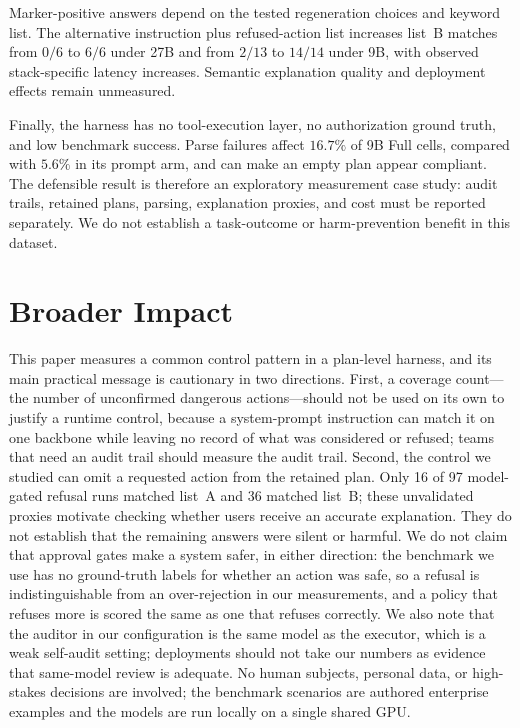 \documentclass[11pt]{article}
\begin{document}
Marker-positive answers depend on the tested regeneration choices and keyword list.
The alternative instruction plus refused-action list increases list~B matches from
$0/6$ to $6/6$ under 27B and from $2/13$ to $14/14$ under 9B, with observed
stack-specific latency increases. Semantic explanation quality and deployment effects
remain unmeasured.

Finally, the harness has no tool-execution layer, no authorization ground truth, and
low benchmark success. Parse failures affect $16.7\%$ of 9B Full cells, compared with
$5.6\%$ in its prompt arm, and can make an empty plan appear compliant. The defensible
result is therefore an exploratory measurement case study: audit trails, retained
plans, parsing, explanation proxies, and cost must be reported separately. We do not
establish a task-outcome or harm-prevention benefit in this dataset.

\section*{Broader Impact}

This paper measures a common control pattern in a plan-level harness, and
its main practical message is cautionary in two directions. First, a coverage
count---the number of unconfirmed dangerous actions---should not be used on its
own to justify a runtime control, because a system-prompt instruction can
match it on one backbone while leaving no record of what was considered or refused; teams that
need an audit trail should measure the audit trail. Second, the control we
studied can omit a requested action from the retained plan. Only 16 of 97 model-gated refusal runs matched list~A and 36 matched list~B; these unvalidated proxies motivate checking whether users receive an accurate explanation. They do not establish that the remaining answers were silent or harmful. We do not claim that approval gates make a
system safer, in either direction: the benchmark we use has no ground-truth
labels for whether an action was safe, so a refusal is indistinguishable from an
over-rejection in our measurements, and a policy that refuses more is scored the
same as one that refuses correctly. We also note that the auditor in our
configuration is the same model as the executor, which is a weak self-audit
setting; deployments should not take our numbers as evidence that
same-model review is adequate. No human subjects, personal data, or
high-stakes decisions are involved; the benchmark scenarios are authored
enterprise examples and the models are run locally on a single shared GPU.



\end{document}
